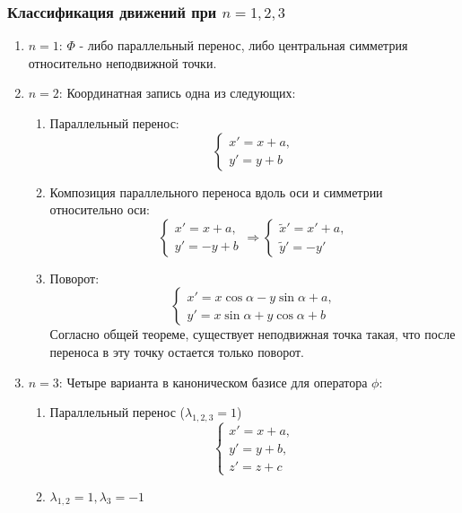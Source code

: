 \subsubsection*{Классификация движений при $n=1,2,3$}
\begin{enumerate}
    \item $n=1$: $\Phi$ - либо параллельный перенос, либо центральная симметрия относительно неподвижной точки.
    \item $n=2$: Координатная запись одна из следующих:
    \begin{enumerate}
        \item Параллельный перенос:
        \[\begin{cases}
            x'=x+a,\\
            y'=y+b
        \end{cases}
        \]
        \item Композиция параллельного переноса вдоль оси и симметрии относительно оси:
        \[
        \begin{cases}
            x'=x+a,\\
            y'=-y+b
        \end{cases} \Longrightarrow
        \begin{cases}
            \widetilde{x}'=x'+a,\\
            \widetilde{y}'=-y'
        \end{cases}
        \] 
        \item Поворот:
        \[
        \begin{cases}
            x'=x\cos{\alpha}-y\sin{\alpha}+a,\\
            y'=x\sin{\alpha}+y\cos{\alpha}+b
        \end{cases}
        \]
        Согласно общей теореме, существует неподвижная точка такая, что после переноса в эту точку остается только поворот.
    \end{enumerate}
    \item $n=3$: Четыре варианта в каноническом базисе для оператора $\phi$:
    \begin{enumerate}
        \item Параллельный перенос ($\lambda_{1,2,3}=1$)
        \[
        \begin{cases}
            x'=x+a,\\
            y'=y+b,\\
            z'=z+c
        \end{cases}
        \]
        \item $\lambda_{1,2}=1, \lambda_3=-1$

\end{enumerate}
\end{enumerate}
